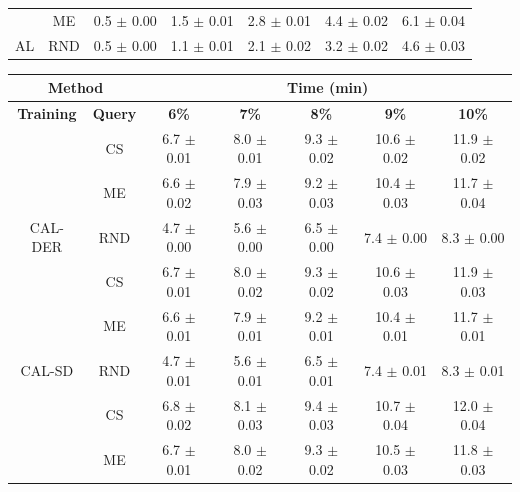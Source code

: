 \begin{table}[htbp]
\begin{tabular*}{\linewidth}{c|c|@{\extracolsep{\fill}}ccccc}
 & ME & 0.5 $\pm$ {\small 0.00} & 1.5 $\pm$ {\small 0.01} & 2.8 $\pm$ {\small 0.01} & 4.4 $\pm$ {\small 0.02} & 6.1 $\pm$ {\small 0.04}\\

\multirow{-3}{*}{\raggedright\arraybackslash AL} & RND & 0.5 $\pm$ {\small 0.00} & 1.1 $\pm$ {\small 0.01} & 2.1 $\pm$ {\small 0.02} & 3.2 $\pm$ {\small 0.02} & 4.6 $\pm$ {\small 0.03}\\
\bottomrule
\end{tabular*}
\vspace{0.5em}

\begin{tabular*}{\linewidth}{c|c|@{\extracolsep{\fill}}ccccc}
\toprule
\multicolumn{2}{c|}{\textbf{Method}} & \multicolumn{5}{c}{\textbf{Time (min)}} \\
\midrule
\textbf{Training} & \textbf{Query} & \textbf{6\%} & \textbf{7\%} & \textbf{8\%} & \textbf{9\%} & \textbf{10\%}\\
\midrule
 & CS & 6.7 $\pm$ {\small 0.01} & 8.0 $\pm$ {\small 0.01} & 9.3 $\pm$ {\small 0.02} & 10.6 $\pm$ {\small 0.02} & 11.9 $\pm$ {\small 0.02}\\

 & ME & 6.6 $\pm$ {\small 0.02} & 7.9 $\pm$ {\small 0.03} & 9.2 $\pm$ {\small 0.03} & 10.4 $\pm$ {\small 0.03} & 11.7 $\pm$ {\small 0.04}\\

\multirow{-3}{*}{\raggedright\arraybackslash CAL-DER} & RND & 4.7 $\pm$ {\small 0.00} & 5.6 $\pm$ {\small 0.00} & 6.5 $\pm$ {\small 0.00} & 7.4 $\pm$ {\small 0.00} & 8.3 $\pm$ {\small 0.00}\\
\midrule
 & CS & 6.7 $\pm$ {\small 0.01} & 8.0 $\pm$ {\small 0.02} & 9.3 $\pm$ {\small 0.02} & 10.6 $\pm$ {\small 0.03} & 11.9 $\pm$ {\small 0.03}\\

 & ME & 6.6 $\pm$ {\small 0.01} & 7.9 $\pm$ {\small 0.01} & 9.2 $\pm$ {\small 0.01} & 10.4 $\pm$ {\small 0.01} & 11.7 $\pm$ {\small 0.01}\\

\multirow{-3}{*}{\raggedright\arraybackslash CAL-SD} & RND & 4.7 $\pm$ {\small 0.01} & 5.6 $\pm$ {\small 0.01} & 6.5 $\pm$ {\small 0.01} & 7.4 $\pm$ {\small 0.01} & 8.3 $\pm$ {\small 0.01}\\
\midrule
 & CS & 6.8 $\pm$ {\small 0.02} & 8.1 $\pm$ {\small 0.03} & 9.4 $\pm$ {\small 0.03} & 10.7 $\pm$ {\small 0.04} & 12.0 $\pm$ {\small 0.04}\\

 & ME & 6.7 $\pm$ {\small 0.01} & 8.0 $\pm$ {\small 0.02} & 9.3 $\pm$ {\small 0.02} & 10.5 $\pm$ {\small 0.03} & 11.8 $\pm$ {\small 0.03}\\


\end{tabular*}
\end{table}
